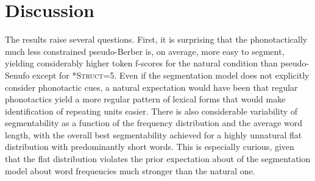 \documentclass[11pt]{article}
\begin{document}
\section{Discussion}
\vspace*{-5pt}
The results raise several questions. First, it is surprising that the phonotactically much less constrained pseudo-Berber is, on average, more easy to segment, yielding considerably higher token f-scores for the natural  condition than pseudo-Senufo except for \textsc{*Struct}=5. Even if the segmentation model does not explicitly consider phonotactic cues, a natural expectation would have been that regular phonotactics yield a more regular pattern of lexical forms that would make identification of repeating units easier. There is also considerable variability of segmentability as a function of the frequency distribution and the average word length, with the overall best segmentability achieved for a highly unnatural flat distribution with predominantly short words. This is especially curious, given that the flat distribution violates the prior expectation about of the segmentation model about word frequencies much stronger than the natural one.
\end{document}
